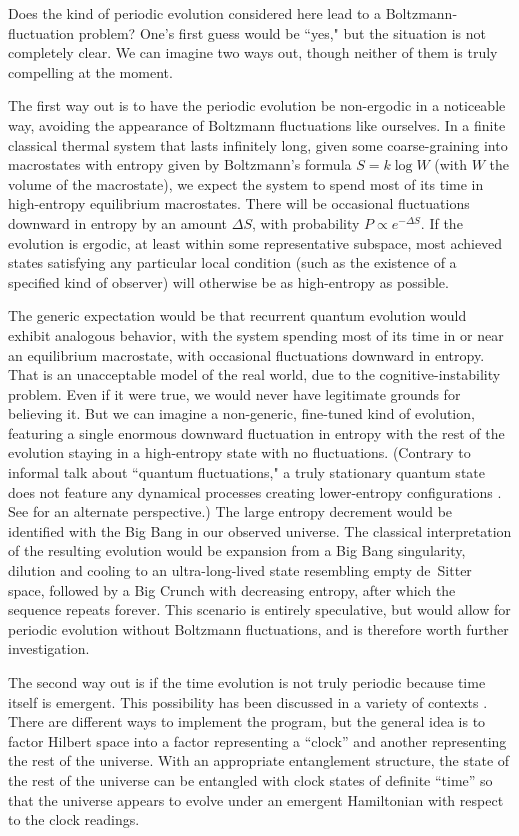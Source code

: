 \documentclass[aps,prd,nofootinbib,notitlepage,12pt]{revtex4-2}
\begin{document}
Does the kind of periodic evolution considered here lead to a Boltzmann-fluctuation problem?
One's first guess would be ``yes," but the situation is not completely clear.
We can imagine two ways out, though neither of them is truly compelling at the moment.

The first way out is to have the periodic evolution be non-ergodic in a noticeable way, avoiding the appearance of Boltzmann fluctuations like ourselves.
In a finite classical thermal system that lasts infinitely long, given some coarse-graining into macrostates with entropy given by Boltzmann's formula $S=k\log W$ (with $W$ the volume of the macrostate), we expect the system to spend most of its time in high-entropy equilibrium macrostates.
There will be occasional fluctuations downward in entropy by an amount $\Delta S$, with probability $P \propto e^{-\Delta S}$.
If the evolution is ergodic, at least within some representative subspace, most achieved states satisfying any particular local condition (such as the existence of a specified kind of observer) will otherwise be as high-entropy as possible. 

The generic expectation would be that recurrent quantum evolution would exhibit analogous behavior, with the system spending most of its time in or near an equilibrium macrostate, with occasional fluctuations downward in entropy.
That is an unacceptable model of the real world, due to the cognitive-instability problem.
Even if it were true, we would never have legitimate grounds for believing it.
But we can imagine a non-generic, fine-tuned kind of evolution, featuring a single enormous downward fluctuation in entropy with the rest of the evolution staying in a high-entropy state with no fluctuations.
(Contrary to informal talk about ``quantum fluctuations," a truly stationary quantum state does not feature any dynamical processes creating lower-entropy configurations \cite{Boddy_2016}. See \cite{Lloyd:2016ahu} for an alternate perspective.)
The large entropy decrement would be identified with the Big Bang in our observed universe.
The classical interpretation of the resulting evolution would be expansion from a Big Bang singularity, dilution and cooling to an ultra-long-lived state resembling empty de~Sitter space, followed by a Big Crunch with decreasing entropy, after which the sequence repeats forever.
This scenario is entirely speculative, but would allow for periodic evolution without Boltzmann fluctuations, and is therefore worth further investigation. 

The second way out is if the time evolution is not truly periodic because time itself is emergent.
This possibility has been discussed in a variety of contexts \cite{Page:1983uc,Banks:1984cw,Albrecht:2007mm,Rovelli:2009ee,Giovannetti:2015qha,Marletto:2016gwv,Singh:2020kdu}.
There are different ways to implement the program, but the general idea is to factor Hilbert space into a factor representing a ``clock'' and another representing the rest of the universe.
With an appropriate entanglement structure, the state of the rest of the universe can be entangled with clock states of definite ``time'' so that the universe appears to evolve under an emergent Hamiltonian with respect to the clock readings.
\end{document}
